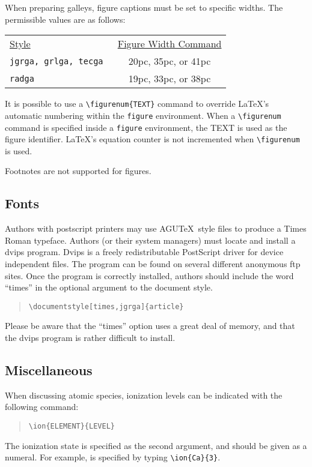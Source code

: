 When preparing galleys, figure captions must be set to 
specific widths.  The permissible values are as follows:
\vspace{-1pc}
\begin{center}
\begin{tabular}{p{1.4in}c}
\underline{Style} & \underline{Figure Width Command}\\
\tt jgrga, grlga, tecga  & 20pc, 35pc, or 41pc\\
\tt radga  & 19pc, 33pc, or 38pc\\
\end{tabular}
\end{center}

It is possible to use a \verb"\figurenum{TEXT}" command to override 
\LaTeX's automatic numbering within the {\tt figure} environment.
When a \verb"\figurenum" command is specified inside a {\tt figure} 
environment, the {\small TEXT} is used as the figure identifier.  
\LaTeX's equation counter is not incremented when \verb"\figurenum" 
is used.

Footnotes are not supported for figures.

\subsection{Fonts}
Authors with postscript printers may use AGU\TeX\ style files to produce 
a Times Roman typeface.  Authors (or their system managers) must locate and 
install a dvips program.  Dvips is a freely redistributable PostScript driver 
for device independent files.  The program can be found on several different 
anonymous ftp sites.  Once the program is correctly installed, authors should 
include the word ``times'' in the optional argument to the document style.
\begin{center}
\begin{quote}
\verb"\documentstyle[times,jgrga]{article}"
\end{quote}
\end{center}
Please be aware that the ``times'' option uses a great deal of memory, and 
that the dvips program is rather difficult to install.  

\subsection{Miscellaneous}

When discussing atomic species, ionization levels 
can be indicated with the following command:
\begin{quote}
\verb"\ion{ELEMENT}{LEVEL}"
\end{quote}
The ionization state is specified as the second argument,
and should be given as a numeral.  For example,  
is specified by typing \verb"\ion{Ca}{3}".

